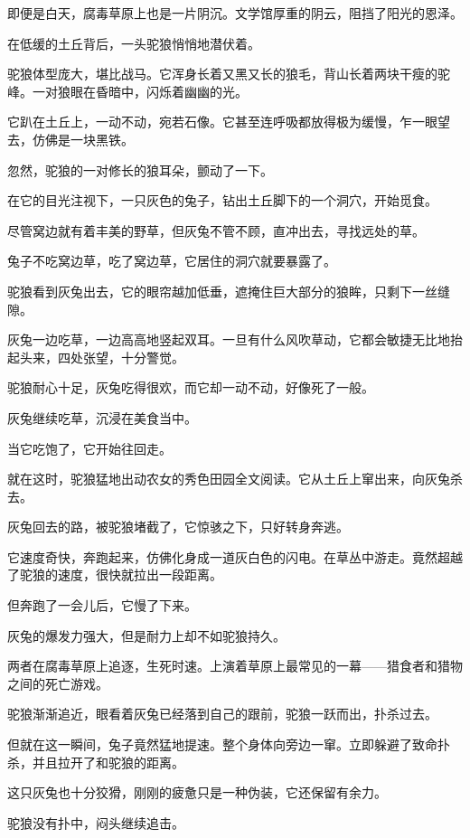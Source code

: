 
\begin{this_body}

即便是白天，腐毒草原上也是一片阴沉。文学馆厚重的阴云，阻挡了阳光的恩泽。

在低缓的土丘背后，一头驼狼悄悄地潜伏着。

驼狼体型庞大，堪比战马。它浑身长着又黑又长的狼毛，背山长着两块干瘦的驼峰。一对狼眼在昏暗中，闪烁着幽幽的光。

它趴在土丘上，一动不动，宛若石像。它甚至连呼吸都放得极为缓慢，乍一眼望去，仿佛是一块黑铁。

忽然，驼狼的一对修长的狼耳朵，颤动了一下。

在它的目光注视下，一只灰色的兔子，钻出土丘脚下的一个洞穴，开始觅食。

尽管窝边就有着丰美的野草，但灰兔不管不顾，直冲出去，寻找远处的草。

兔子不吃窝边草，吃了窝边草，它居住的洞穴就要暴露了。

驼狼看到灰兔出去，它的眼帘越加低垂，遮掩住巨大部分的狼眸，只剩下一丝缝隙。

灰兔一边吃草，一边高高地竖起双耳。一旦有什么风吹草动，它都会敏捷无比地抬起头来，四处张望，十分警觉。

驼狼耐心十足，灰兔吃得很欢，而它却一动不动，好像死了一般。

灰兔继续吃草，沉浸在美食当中。

当它吃饱了，它开始往回走。

就在这时，驼狼猛地出动农女的秀色田园全文阅读。它从土丘上窜出来，向灰兔杀去。

灰兔回去的路，被驼狼堵截了，它惊骇之下，只好转身奔逃。

它速度奇快，奔跑起来，仿佛化身成一道灰白色的闪电。在草丛中游走。竟然超越了驼狼的速度，很快就拉出一段距离。

但奔跑了一会儿后，它慢了下来。

灰兔的爆发力强大，但是耐力上却不如驼狼持久。

两者在腐毒草原上追逐，生死时速。上演着草原上最常见的一幕——猎食者和猎物之间的死亡游戏。

驼狼渐渐追近，眼看着灰兔已经落到自己的跟前，驼狼一跃而出，扑杀过去。

但就在这一瞬间，兔子竟然猛地提速。整个身体向旁边一窜。立即躲避了致命扑杀，并且拉开了和驼狼的距离。

这只灰兔也十分狡猾，刚刚的疲惫只是一种伪装，它还保留有余力。

驼狼没有扑中，闷头继续追击。


\end{this_body}
